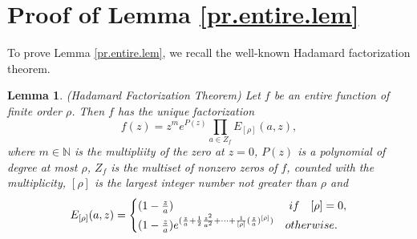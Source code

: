 \documentclass[11pt,oneside,reqno]{amsart}
\newtheorem{lem}[thm]{Lemma}
\numberwithin{equation}{section}
\def\N{ {\mathbb N} }
\begin{document}
\section{Proof of Lemma \ref{pr.entire.lem}}\label{appendix.sec}
 To prove Lemma \ref{pr.entire.lem}, we recall the well-known  Hadamard factorization theorem.



\begin{lem}\label{Hadamard.lem}{\rm(}Hadamard Factorization Theorem{\rm)} {\rm\cite{Branges} Let $f$ be an entire function of finite order $\rho$. Then $f$ has the unique factorization $$f(z)=z^{m}e^{P(z)}\prod_{a\in Z_f}E_{[\rho]}(a,z),$$
where $m\in \N$ is the multipliity of the zero at $z=0$, $P(z)$ is a polynomial of degree at most $\rho$, $Z_f$ is the multiset of nonzero zeros of $f$, counted with the multiplicity,  $[\rho]$ is the largest integer number not greater than $\rho$ and %
\begin{equation*}%
 E_{[\rho]}(a,z)=
\begin{cases}
(1-\frac{z}{a} )& {\rm \ if}\quad [\rho]=0,\\
(1-\frac{z}{a})e^{(\frac{z}{a}+\frac{1}{2}\frac{z^{2}}{a^{2}}+\cdot\cdot\cdot+\frac{1}{[\rho]}(\frac{z}{a})^{[\rho]})}& {\rm otherwise}.
\end{cases}
\end{equation*} }
\end{lem}
\end{document}
